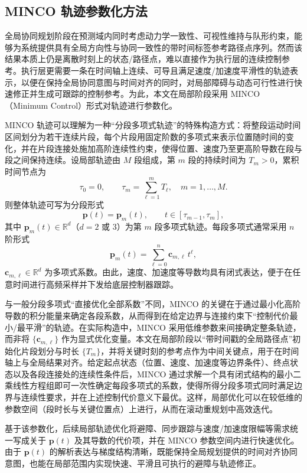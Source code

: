 \subsection{MINCO 轨迹参数化方法}\label{subsec:minco_intro}

全局协同规划阶段在预测域内同时考虑动力学一致性、可视性维持与队形约束，能够为系统提供具有全局方向性与协同一致性的带时间标签参考路径点序列。然而该结果本质上仍是离散时刻上的状态/路径点，难以直接作为执行层的连续控制参考。执行层更需要一条在时间轴上连续、可导且满足速度/加速度平滑性的轨迹表示，以便在保持全局协同意图与时间对齐的同时，对局部障碍与动态可行性进行快速修正并生成可跟踪的控制参考。为此，本文在局部阶段采用 MINCO（Minimum Control）形式对轨迹进行参数化\cite{wang2022geometrically}。

MINCO 轨迹可以理解为一种“分段多项式轨迹”的特殊构造方式：将整段运动时间区间划分为若干连续片段，每个片段用固定阶数的多项式来表示位置随时间的变化，并在片段连接处施加高阶连续性约束，使得位置、速度乃至更高阶导数在段与段之间保持连续。设局部轨迹由 \(M\) 段组成，第 \(m\) 段的持续时间为 \(T_m>0\)，累积时间节点为
\[
\tau_0=0,\qquad \tau_m=\sum_{\ell=1}^{m}T_\ell,\quad m=1,\dots,M.
\]
则整体轨迹可写为分段形式
\[
\mathbf{p}(t)=\mathbf{p}_m(t),\qquad t\in[\tau_{m-1},\tau_m],
\]
其中 \(\mathbf{p}_m(t)\in\mathbb{R}^d\)（\(d=2\) 或 \(3\)）为第 \(m\) 段多项式轨迹。每段多项式通常采用 \(n\) 阶形式
\[
\mathbf{p}_m(t)=\sum_{\ell=0}^{n}\mathbf{c}_{m,\ell}\,t^\ell,
\]
\(\mathbf{c}_{m,\ell}\in\mathbb{R}^d\) 为多项式系数。由此，速度、加速度等导数均具有闭式表达，便于在任意时间进行高频采样并下发给底层控制器跟踪。

与一般分段多项式“直接优化全部系数”不同，MINCO 的关键在于通过最小化高阶导数的积分能量来确定各段系数，从而得到在给定边界与连接约束下“控制代价最小/最平滑”的轨迹。在实际构造中，MINCO 采用低维参数来间接确定整条轨迹，而非将 \(\{\mathbf{c}_{m,\ell}\}\) 作为显式优化变量。本文在局部阶段以“带时间戳的全局路径点”初始化片段划分与时长 \(\{T_m\}\)，并将关键时刻的参考点作为中间关键点，用于在时间轴上与全局结果对齐。给定起点状态（位置、速度、加速度等边界条件）、终点状态以及各段连接处的连续性条件后，MINCO 通过求解一个具有闭式结构的最小二乘线性方程组即可一次性确定每段多项式的系数，使得所得分段多项式同时满足边界与连续性要求，并在上述控制代价意义下最优。这样，局部优化可以在较低维的参数空间（段时长与关键位置点）上进行，从而在滚动重规划中高效迭代。

基于该参数化，后续局部轨迹优化将避障、同步跟踪与速度/加速度限幅等需求统一写成关于 \(\mathbf{p}(t)\) 及其导数的代价项，并在 MINCO 参数空间内进行快速优化。由于 \(\mathbf{p}(t)\) 的解析表达与梯度结构清晰，既能保持全局规划提供的时间对齐协同意图，也能在局部范围内实现快速、平滑且可执行的避障与轨迹修正。

